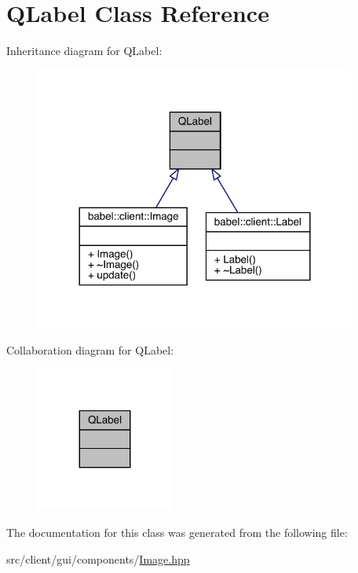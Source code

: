 \hypertarget{class_q_label}{}\section{Q\+Label Class Reference}
\label{class_q_label}


Inheritance diagram for Q\+Label\+:\nopagebreak
\begin{figure}[H]
\begin{center}
\leavevmode
\includegraphics[width=300pt]{class_q_label__inherit__graph}
\end{center}
\end{figure}


Collaboration diagram for Q\+Label\+:\nopagebreak
\begin{figure}[H]
\begin{center}
\leavevmode
\includegraphics[width=128pt]{class_q_label__coll__graph}
\end{center}
\end{figure}


The documentation for this class was generated from the following file\+:\begin{DoxyCompactItemize}
\item 
src/client/gui/components/\mbox{\hyperlink{_image_8hpp}{Image.\+hpp}}\end{DoxyCompactItemize}
